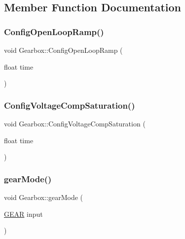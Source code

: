 \subsection{Member Function Documentation}
\mbox{\label{classGearbox_a3773e045e94a3a83af6fea4997244ddf}} 
\subsubsection{\texorpdfstring{Config\+Open\+Loop\+Ramp()}{ConfigOpenLoopRamp()}}
{\footnotesize\ttfamily void Gearbox\+::\+Config\+Open\+Loop\+Ramp (\begin{DoxyParamCaption}\item[{float}]{time }\end{DoxyParamCaption})}

\mbox{\label{classGearbox_a8265e628f91ba9eeda7545d4b74d828b}} 
\subsubsection{\texorpdfstring{Config\+Voltage\+Comp\+Saturation()}{ConfigVoltageCompSaturation()}}
{\footnotesize\ttfamily void Gearbox\+::\+Config\+Voltage\+Comp\+Saturation (\begin{DoxyParamCaption}\item[{float}]{time }\end{DoxyParamCaption})}

\mbox{\label{classGearbox_aa8287282dff09b8392929a48c046d2cd}} 
\subsubsection{\texorpdfstring{gear\+Mode()}{gearMode()}}
{\footnotesize\ttfamily void Gearbox\+::gear\+Mode (\begin{DoxyParamCaption}\item[{\hyperlink{Gearbox_8h_af8596e33b77fa343a7c7f9275df5e7c4}{G\+E\+AR}}]{input }\end{DoxyParamCaption})}

